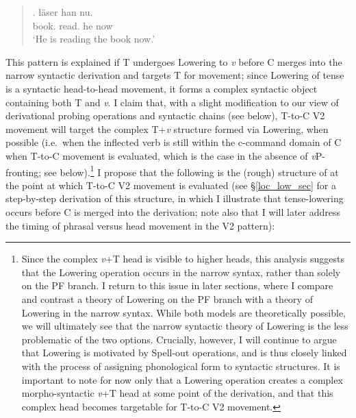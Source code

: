 \singlespacing
\begin{quote}
\begin{minipage}{5in}
\exg. \label{SeV2_repeata}
\I[DP Boken] l\"{a}ser han nu.\\
\hspace{1pt} \hspace{1pt} book. read. he now\\
`He is reading the book now.' \\

\end{minipage}
\end{quote}
\onehalfspacing
This pattern is explained if T undergoes Lowering to \textit{v} before C merges into the narrow syntactic derivation and targets T for movement; since Lowering of tense is a syntactic head-to-head movement, it forms a complex syntactic object containing both T and \textit{v}. I claim that, with a slight modification to our view of derivational probing operations and syntactic chains (see below), T-to-C V2 movement will target the complex T+\textit{v} structure formed via Lowering, when possible (i.e.\ when the inflected verb is still within the c-command domain of C when T-to-C movement is evaluated, which is the case in the absence of \textit{v}P-fronting; see below).\footnote{\label{narrow_syn_low_fn}Since the complex {\it v}+T head is visible to higher heads, this analysis suggests that the Lowering operation occurs in the narrow syntax, rather than solely on the PF branch. I return to this issue in later sections, where I compare and contrast a theory of Lowering on the PF branch with a theory of Lowering in the narrow syntax. While both models are theoretically possible, we will ultimately see that the narrow syntactic theory of Lowering is the less problematic of the two options. Crucially, however, I will continue to argue that Lowering is motivated by Spell-out operations, and is thus closely linked with the process of assigning phonological form to syntactic structures. It is important to note for now only that a Lowering operation creates a complex morpho-syntactic {\it v}+T head at some point of the derivation, and that this complex head becomes targetable for T-to-C V2 movement.} I propose that the following is the (rough) structure of \Last at the point at which T-to-C V2 movement is evaluated (see \S\ref{loc_low_sec} for a step-by-step derivation of this structure, in which I illustrate that tense-lowering occurs before C is merged into the derivation; note also that I will later address the timing of phrasal versus head movement in the V2 pattern):

